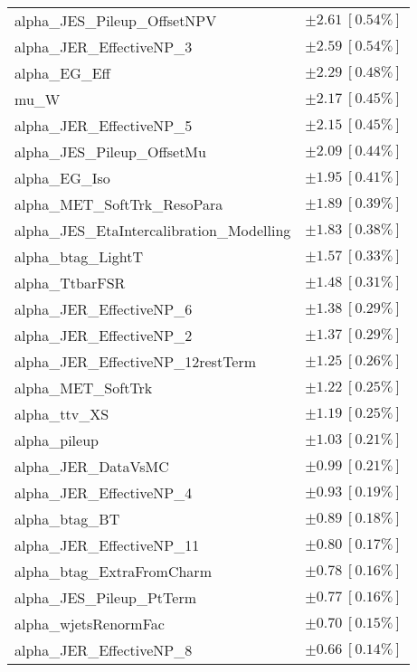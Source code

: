 \begin{table}
\begin{center}
\begin{tabular*}{\textwidth}{@{\extracolsep{\fill}}lc}
alpha\_JES\_Pileup\_OffsetNPV         & $\pm 2.61\ [0.54\%] $       \\
alpha\_JER\_EffectiveNP\_3         & $\pm 2.59\ [0.54\%] $       \\
alpha\_EG\_Eff         & $\pm 2.29\ [0.48\%] $       \\
mu\_W         & $\pm 2.17\ [0.45\%] $       \\
alpha\_JER\_EffectiveNP\_5         & $\pm 2.15\ [0.45\%] $       \\
alpha\_JES\_Pileup\_OffsetMu         & $\pm 2.09\ [0.44\%] $       \\
alpha\_EG\_Iso         & $\pm 1.95\ [0.41\%] $       \\
alpha\_MET\_SoftTrk\_ResoPara         & $\pm 1.89\ [0.39\%] $       \\
alpha\_JES\_EtaIntercalibration\_Modelling         & $\pm 1.83\ [0.38\%] $       \\
alpha\_btag\_LightT         & $\pm 1.57\ [0.33\%] $       \\
alpha\_TtbarFSR         & $\pm 1.48\ [0.31\%] $       \\
alpha\_JER\_EffectiveNP\_6         & $\pm 1.38\ [0.29\%] $       \\
alpha\_JER\_EffectiveNP\_2         & $\pm 1.37\ [0.29\%] $       \\
alpha\_JER\_EffectiveNP\_12restTerm         & $\pm 1.25\ [0.26\%] $       \\
alpha\_MET\_SoftTrk         & $\pm 1.22\ [0.25\%] $       \\
alpha\_ttv\_XS         & $\pm 1.19\ [0.25\%] $       \\
alpha\_pileup         & $\pm 1.03\ [0.21\%] $       \\
alpha\_JER\_DataVsMC         & $\pm 0.99\ [0.21\%] $       \\
alpha\_JER\_EffectiveNP\_4         & $\pm 0.93\ [0.19\%] $       \\
alpha\_btag\_BT         & $\pm 0.89\ [0.18\%] $       \\
alpha\_JER\_EffectiveNP\_11         & $\pm 0.80\ [0.17\%] $       \\
alpha\_btag\_ExtraFromCharm         & $\pm 0.78\ [0.16\%] $       \\
alpha\_JES\_Pileup\_PtTerm         & $\pm 0.77\ [0.16\%] $       \\
alpha\_wjetsRenormFac         & $\pm 0.70\ [0.15\%] $       \\
alpha\_JER\_EffectiveNP\_8         & $\pm 0.66\ [0.14\%] $       \\

\end{tabular*}
\end{center}
\end{table}
